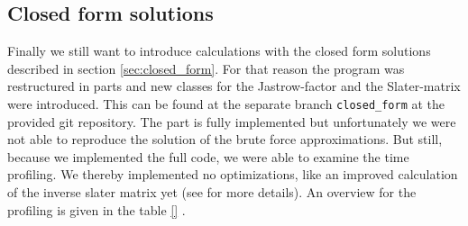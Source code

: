 \subsection{Closed form solutions}\label{sec:closed_form_eval}
Finally we still want to introduce calculations with the closed form solutions described in section \ref{sec:closed_form}. For that reason the program was restructured in parts and new classes for the Jastrow-factor and the Slater-matrix were introduced. This can be found at the separate branch \texttt{closed\_form} at the provided git repository. The part is fully implemented but unfortunately we were not able to reproduce the solution of the brute force approximations. But still, because we implemented the full code, we were able to examine the time profiling. We thereby implemented no optimizations, like an improved calculation of the inverse slater matrix yet (see \citet{hogberget2013} for more details). An overview for the profiling is given in the table \ref{} .